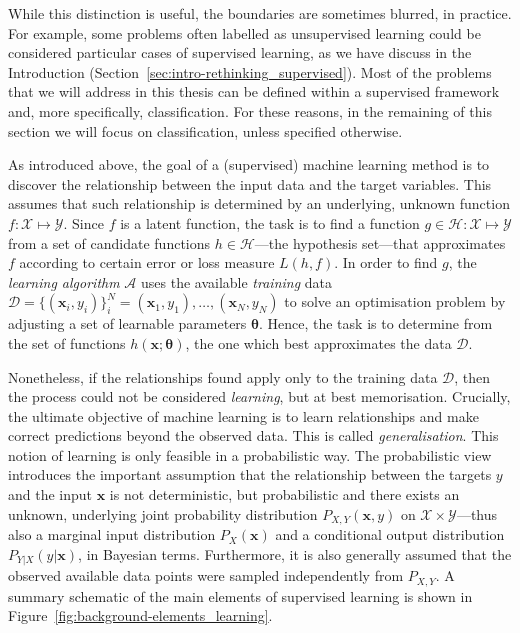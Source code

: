 {While this distinction is useful, the boundaries are sometimes blurred, in practice. For example, some problems often labelled as unsupervised learning could be considered particular cases of supervised learning, as we have discuss in the Introduction (Section~\ref{sec:intro-rethinking_supervised}). Most of the problems that we will address in this thesis can be defined within a supervised framework and, more specifically, classification. For these reasons, in the remaining of this section we will focus on classification, unless specified otherwise.

As introduced above, the goal of a (supervised) machine learning method is to discover the relationship between the input data and the target variables. This assumes that such relationship is determined by an underlying, unknown function $f \colon \mathcal{X} \mapsto \mathcal{Y}$. Since $f$ is a latent function, the task is to find a function $g \in \mathcal{H} \colon \mathcal{X} \mapsto \mathcal{Y}$ from a set of candidate functions $h \in \mathcal{H}$---the hypothesis set---that approximates $f$ according to certain error or loss measure $L(h, f)$. In order to find $g$, the \textit{learning algorithm} $\mathcal{A}$ uses the available \textit{training} data $\mathcal{D} = \{(\mathbf{x}_{i}, y_{i})\}_{i}^{N} = (\mathbf{x}_{1}, y_{1}), \ldots, (\mathbf{x}_{N}, y_{N})$ to solve an optimisation problem by adjusting a set of learnable parameters $\boldsymbol{\theta}$. Hence, the task is to determine from the set of functions $h(\mathbf{x}; \boldsymbol{\theta})$, the one which best approximates the data $\mathcal{D}$.

Nonetheless, if the relationships found apply only to the training data $\mathcal{D}$, then the process could not be considered \textit{learning}, but at best memorisation. Crucially, the ultimate objective of machine learning is to learn relationships and make correct predictions beyond the observed data. This is called \textit{generalisation}. This notion of learning is only feasible in a probabilistic way. The probabilistic view introduces the important assumption that the relationship between the targets $y$ and the input $\mathbf{x}$ is not deterministic, but probabilistic and there exists an unknown, underlying joint probability distribution $P_{X,Y}(\mathbf{x}, y)$ on $\mathcal{X} \times \mathcal{Y}$---thus also a marginal input distribution $P_{X}(\mathbf{x})$ and a conditional output distribution $P_{Y|X}(y|\mathbf{x})$, in Bayesian terms. Furthermore, it is also generally assumed that the observed available data points were sampled independently from $P_{X,Y}$. A summary schematic of the main elements of supervised learning is shown in Figure~\ref{fig:background-elements_learning}.

}
